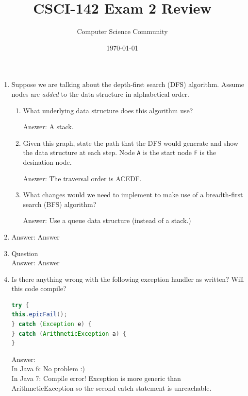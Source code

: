\documentclass[11pt]{article}
\title{CSCI-142 Exam 2 Review}
\author{Computer Science Community}
\date{\today}
\newenvironment{answer}{\large\lstset{basicstyle=\large\ttfamily}\color{white} \small{Answer:}}{}
\newenvironment{answer}{\large\lstset{basicstyle=\large\ttfamily}\color{red} \small{Answer:}}{}
\begin{document}
\header
\begin{enumerate}


\item Suppose we are talking about the depth-first search (DFS) algorithm.
Assume nodes are \emph{added} to the data structure in alphabetical order.
\begin{enumerate}
\item What underlying data structure does this algorithm use?

\begin{answer}
A stack.
\end{answer}

\item %
Given this graph, state the path that the DFS would generate and show the data structure at each step.
Node \texttt{A} is the start node \texttt{F} is the desination node.

\begin{answer}
The traversal order is ACEDF.
\end{answer}

\item %
What changes would we need to implement to make use of a breadth-first search (BFS) algorithm?

\begin{answer}
Use a queue data structure (instead of a stack.)
\end{answer}

\end{enumerate}

\item 
\begin{answer}
Answer
\end{answer}


\item Question \\
\begin{answer}
Answer
\end{answer}



\item Is there anything wrong with the following exception handler as written? Will this
code compile? 
\begin{lstlisting}[language=java]
try {
this.epicFail();
} catch (Exception e) {
} catch (ArithmeticException a) {
}
\end{lstlisting}
\begin{answer}
\\ In Java 6: No problem :)
\\ In Java 7: Compile error!  Exception is more generic than ArithmeticException so the second catch statement is unreachable.
\end{answer}




\end{enumerate}
\end{document}
